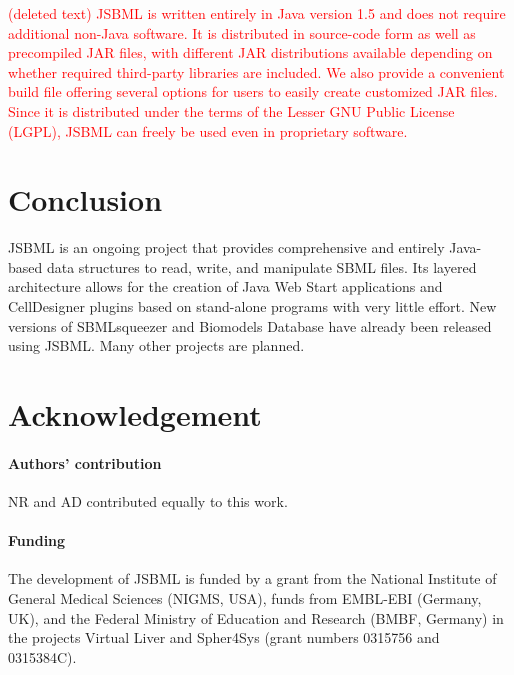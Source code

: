 \documentclass{bioinfo}
\begin{document}

\textcolor{red}{(deleted text) JSBML is written entirely in Java version 1.5 and does
not require additional non-Java software.
It is distributed in source-code form as well as precompiled JAR files,
with different JAR distributions available depending on whether required
third-party libraries are included. We also provide a convenient build
file offering several options for users to easily create customized JAR files.
Since it is distributed under the terms of the Lesser GNU Public License (LGPL), 
JSBML can freely be used even in proprietary software.
}


\section{Conclusion}

JSBML is an ongoing project that provides comprehensive and entirely Java-based
data structures to read, write, and manipulate SBML files. Its layered
architecture allows for the creation of Java Web Start applications and
CellDesigner plugins based on stand-alone programs with very little effort.
%
New versions of SBMLsqueezer \citep{Draeger2008} and Biomodels Database
\citep{Li2010} have  already been released using JSBML. Many other projects are
planned.

\section*{Acknowledgement}

\paragraph{Authors' contribution\textcolon} NR and AD contributed equally to
this work.

\paragraph{Funding\textcolon}
The development of JSBML is funded by a grant from the National Institute of
General Medical Sciences (NIGMS, USA), funds from EMBL-EBI (Germany, UK), and
the Federal Ministry of Education and Research (BMBF, Germany) in the projects
Virtual Liver and Spher4Sys (grant numbers 0315756 and 0315384C).
\end{document}

